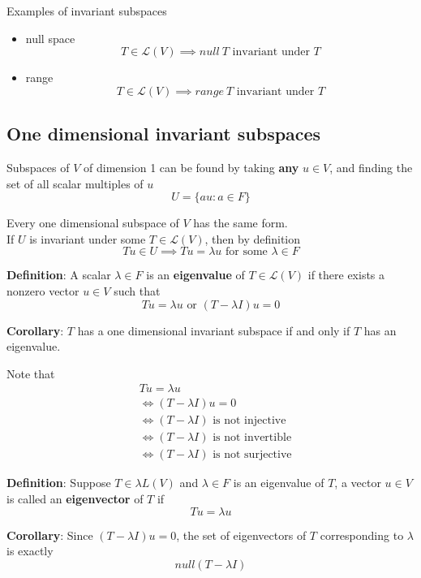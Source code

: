 \documentclass[a4paper, 10pt]{report}
\begin{document}
Examples of invariant subspaces
\begin{itemize}
   \item null space
       \[
          T \in \mathcal{L}(V) \implies null\ T \text{ invariant under $T$}
      \] 
   \item range
       \[
          T \in \mathcal{L}(V) \implies range\ T \text{ invariant under $T$}
      \] 
\end{itemize}

\subsection{One dimensional invariant subspaces}
Subspaces of $V$ of dimension 1 can be found by taking \textbf{any} $u \in V$, and finding the set of all scalar multiples of $u$ 
\[
  U = \{ au : a \in F \} 
\] 

Every one dimensional  subspace of $V$ has the same form. \\

If $U$ is invariant under some $T \in \mathcal{L}(V)$, then by definition
 \[
  Tu \in U \implies Tu = \lambda u \text{ for some } \lambda \in F
\] 

\begin{framed}
   \textbf{Definition}: A scalar $\lambda \in F$ is an \textbf{eigenvalue} of $T \in \mathcal{L}(V)$ if there exists a nonzero vector  $u \in V$ such that
   \[
     Tu = \lambda u  \text{ or } (T - \lambda I) u = 0
   \] 

   \textbf{Corollary}: $T$ has a one dimensional invariant subspace if and only if $T$ has an eigenvalue. 
\end{framed}

Note that
\begin{align*}
   & Tu = \lambda u \\
   & \iff (T - \lambda I) u = 0 \\
   & \iff (T - \lambda I)\text{ is not injective} \\
   & \iff (T - \lambda I)\text{ is not invertible} \\
   & \iff (T - \lambda I)\text{ is not surjective} 
\end{align*}

\begin{framed}
   \textbf{Definition}: Suppose $T \in \lambda{L}(V)$ and $\lambda \in F$ is an eigenvalue of $T$, a vector $u \in V$ is called an \textbf{eigenvector} of $T$ if 
   \[
     Tu = \lambda u
   \] 

   \textbf{Corollary}: Since $(T - \lambda I) u = 0$, the set of eigenvectors of  $T$ corresponding to $\lambda$ is exactly
    \[
    null (T - \lambda I)
   \] 
\end{framed} 
\end{document}
